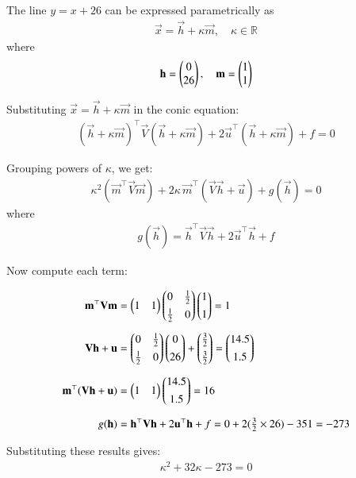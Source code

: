 \documentclass[journal]{IEEEtran}
\begin{document}
The line $y = x + 26$ can be expressed parametrically as
\begin{align}
\vec{x} = \vec{h} + \kappa \vec{m}, \quad \kappa \in \mathbb{R}
\end{align}
where
\begin{align}
\mathbf{h} = \begin{pmatrix}0 \\ 26\end{pmatrix}, \quad \mathbf{m} = \begin{pmatrix}1 \\ 1\end{pmatrix}
\end{align}

Substituting $\vec{x} = \vec{h} + \kappa \vec{m}$ in the conic equation:
\begin{align}
(\vec{h} + \kappa\vec{m})^\top \vec{V}(\vec{h} + \kappa\vec{m})
+ 2\vec{u}^\top (\vec{h} + \kappa\vec{m}) + f = 0
\end{align}

Grouping powers of $\kappa$, we get:
\begin{align}
\kappa^2 (\vec{m}^\top \vec{V}\vec{m})
+ 2\kappa\, \vec{m}^\top (\vec{V}\vec{h} + \vec{u})
+ g(\vec{h}) = 0
\end{align}
where
\begin{align}
g(\vec{h}) = \vec{h}^\top \vec{V}\vec{h} + 2\vec{u}^\top \vec{h} + f
\end{align}

Now compute each term:

\begin{align}
\mathbf{m}^\top \mathbf{V}\mathbf{m} &= 
\begin{pmatrix}1 & 1\end{pmatrix}
\begin{pmatrix}0 & \tfrac{1}{2} \\[4pt] \tfrac{1}{2} & 0\end{pmatrix}
\begin{pmatrix}1 \\[4pt] 1\end{pmatrix}
= 1
\\[6pt]
\mathbf{V}\mathbf{h} + \mathbf{u} &=
\begin{pmatrix}0 & \tfrac{1}{2} \\[4pt] \tfrac{1}{2} & 0\end{pmatrix}\begin{pmatrix}0 \\[4pt] 26\end{pmatrix}
+ \begin{pmatrix}\tfrac{3}{2} \\[4pt] \tfrac{3}{2}\end{pmatrix}
= \begin{pmatrix}14.5 \\[4pt] 1.5\end{pmatrix}
\\[6pt]
\mathbf{m}^\top (\mathbf{V}\mathbf{h} + \mathbf{u}) &= \begin{pmatrix}1 & 1\end{pmatrix}\begin{pmatrix}14.5 \\[4pt] 1.5\end{pmatrix} = 16
\\[6pt]
g(\mathbf{h}) &= \mathbf{h}^\top \mathbf{V}\mathbf{h} + 2\mathbf{u}^\top \mathbf{h} + f
= 0 + 2(\tfrac{3}{2}\times 26) - 351 = -273
\end{align}

Substituting these results gives:
\begin{align}
\kappa^2 + 32\kappa - 273 = 0
\end{align}
\end{document}
